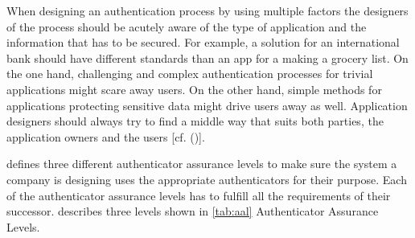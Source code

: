 When designing an authentication process by using multiple factors the designers of the process should be acutely aware of the type of application and the information that has to be secured. For example, a solution for an international bank should have different standards than an app for a making a grocery list. On the one hand, challenging and complex authentication processes for trivial applications might scare away users. On the other hand, simple methods for applications protecting sensitive data might drive users away as well. Application designers should always try to find a middle way that suits both parties, the application owners and the users [cf. (\cite{NIST:2017:DIG})]. 

\cite{NIST:2017:DIGAL} defines three different authenticator assurance levels to make sure the system a company is designing uses the appropriate authenticators for their purpose. Each of the authenticator assurance levels has to fulfill all the requirements of their successor. \cite{NIST:2017:DIGAL} describes three levels shown in \ref{tab:aal} Authenticator Assurance Levels.


